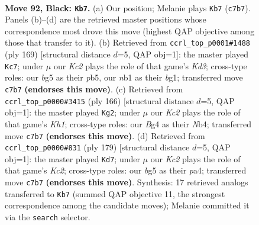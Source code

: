 \documentclass[11pt]{article}
\begin{document}
\clearpage

\begin{figure}[p]\centering
\begin{subfigure}{0.46\textwidth}\centering
\resizebox{\linewidth}{!}{%
\newchessgame
\chessboard[
  setfen={8/2k5/8/6B1/p1p3b1/8/5K2/1N6 b - - 39 92},
  showmover=false,
  pgfstyle=straightmove, color=movearrow, markmove={c7-b7}
]}
\caption{}
\end{subfigure}\hfill
\begin{subfigure}{0.46\textwidth}\centering
\resizebox{\linewidth}{!}{%
\newchessgame
\chessboard[
  setfen={8/8/3k4/1P5b/5p2/8/3K4/6B1 b - - 9 85},
  showmover=false,
  pgfstyle=straightmove, color=movearrow, markmove={d6-c7}
]}
\caption{}
\end{subfigure}
\\[4pt]
\begin{subfigure}{0.46\textwidth}\centering
\resizebox{\linewidth}{!}{%
\newchessgame
\chessboard[
  setfen={8/4n3/4P3/6P1/1N6/8/4k3/7K w - - 5 84},
  showmover=false,
  pgfstyle=straightmove, color=movearrow, markmove={h1-g2}
]}
\caption{}
\end{subfigure}\hfill
\begin{subfigure}{0.46\textwidth}\centering
\resizebox{\linewidth}{!}{%
\newchessgame
\chessboard[
  setfen={8/2k5/8/p2K4/P7/3N4/4p3/8 b - - 47 90},
  showmover=false,
  pgfstyle=straightmove, color=movearrow, markmove={c7-d7}
]}
\caption{}
\end{subfigure}
\caption{\textbf{Move 92, Black: \texttt{Kb7}.} (a) Our position; Melanie plays \texttt{Kb7} (\texttt{c7b7}). Panels (b)--(d) are the retrieved master positions whose correspondence most drove this move (highest QAP objective among those that transfer to it). (b) Retrieved from \texttt{ccrl\_top\_p0001\#1488} (ply 169) [structural distance $d$=5, QAP obj=1]: the master played \texttt{Kc7}; under $\mu$ our \emph{Kc2} plays the role of that game's \emph{Kd3}; cross-type roles: our \emph{b}g5 as their \emph{p}b5, our \emph{n}b1 as their \emph{b}g1; transferred move \texttt{c7b7} \textbf{(endorses this move)}. (c) Retrieved from \texttt{ccrl\_top\_p0000\#3415} (ply 166) [structural distance $d$=5, QAP obj=1]: the master played \texttt{Kg2}; under $\mu$ our \emph{Kc2} plays the role of that game's \emph{Kh1}; cross-type roles: our \emph{B}g4 as their \emph{N}b4; transferred move \texttt{c7b7} \textbf{(endorses this move)}. (d) Retrieved from \texttt{ccrl\_top\_p0000\#831} (ply 179) [structural distance $d$=5, QAP obj=1]: the master played \texttt{Kd7}; under $\mu$ our \emph{Kc2} plays the role of that game's \emph{Kc2}; cross-type roles: our \emph{b}g5 as their \emph{p}a4; transferred move \texttt{c7b7} \textbf{(endorses this move)}. Synthesis: 17 retrieved analogs transferred to \texttt{Kb7} (summed QAP objective 11, the strongest correspondence among the candidate moves); Melanie committed it via the \texttt{search} selector.}
\label{fig:thought-m183}
\end{figure}
\end{document}
